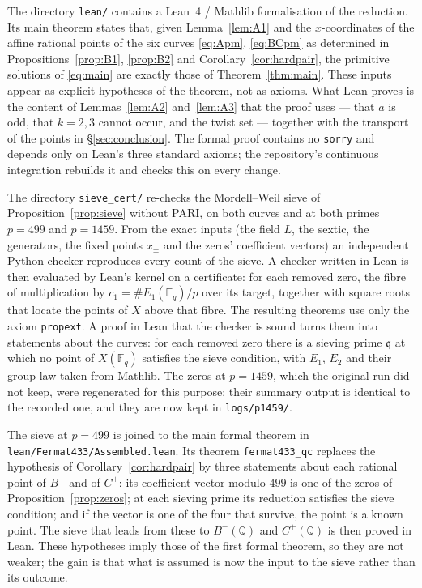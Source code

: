 \documentclass[11pt,reqno]{amsart}
\theoremstyle{plain}
\theoremstyle{definition}
\newcommand{\Q}{\mathbb{Q}}
\newcommand{\FF}{\mathbb{F}}
\newcommand{\qq}{\mathfrak{q}}
\numberwithin{equation}{section}
\begin{document}
The directory \texttt{lean/} contains a Lean~4 / Mathlib formalisation of the
reduction. Its main theorem states that, given Lemma~\ref{lem:A1} and the
$x$-coordinates of the affine rational points of the six curves
\eqref{eq:Apm}, \eqref{eq:BCpm} as determined in
Propositions~\ref{prop:B1}, \ref{prop:B2} and Corollary~\ref{cor:hardpair}, the
primitive solutions of \eqref{eq:main} are exactly those of
Theorem~\ref{thm:main}. These inputs appear as explicit hypotheses of the
theorem, not as axioms. What Lean proves is the content of
Lemmas~\ref{lem:A2} and~\ref{lem:A3} that the proof uses --- that $a$ is odd,
that $k=2,3$ cannot occur, and the twist set --- together with the transport of
the points in \S\ref{sec:conclusion}. The formal proof contains no
\texttt{sorry} and depends only on Lean's three standard axioms; the
repository's continuous integration rebuilds it and checks this on every
change.

The directory \texttt{sieve\_cert/} re-checks the Mordell--Weil sieve of
Proposition~\ref{prop:sieve} without PARI, on both curves and at both primes
$p=499$ and $p=1459$. From the exact inputs (the field $L$, the sextic, the
generators, the fixed points $x_{\pm}$ and the zeros' coefficient vectors) an
independent Python checker reproduces every count of the sieve. A checker
written in Lean is then evaluated by Lean's kernel on a certificate: for each
removed zero, the fibre of multiplication by $c_{1}=\#E_{1}(\FF_{q})/p$ over
its target, together with square roots that locate the points of $X$ above that
fibre. The resulting theorems use only the axiom \texttt{propext}. A proof in
Lean that the checker is sound turns them into statements about the curves:
for each removed zero there is a sieving prime $\qq$ at which no point of
$X(\FF_{q})$ satisfies the sieve condition, with $E_{1}$, $E_{2}$ and their
group law taken from Mathlib. The zeros at $p=1459$, which the original run
did not keep, were regenerated for this purpose; their summary output is
identical to the recorded one, and they are now kept in
\texttt{logs/p1459/}.

The sieve at $p=499$ is joined to the main formal theorem in
\texttt{lean/\allowbreak Fermat433/\allowbreak Assembled.lean}. Its theorem \texttt{fermat433\_\allowbreak qc}
replaces the hypothesis of Corollary~\ref{cor:hardpair} by three statements
about each rational point of $B^{-}$ and of $C^{+}$: its coefficient vector
modulo $499$ is one of the zeros of Proposition~\ref{prop:zeros}; at each
sieving prime its reduction satisfies the sieve condition; and if the vector is
one of the four that survive, the point is a known point. The sieve that leads
from these to $B^{-}(\Q)$ and $C^{+}(\Q)$ is then proved in Lean. These
hypotheses imply those of the first formal theorem, so they are not weaker; the
gain is that what is assumed is now the input to the sieve rather than its
outcome.
\end{document}
